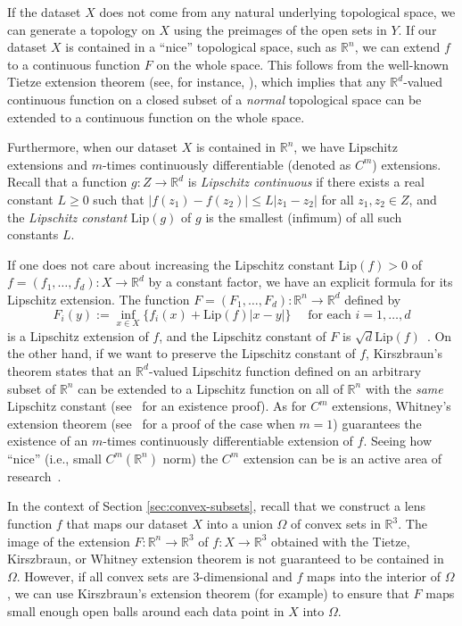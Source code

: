 \documentclass[reqno,oneside,11pt]{amsart}
\theoremstyle{definition}
\theoremstyle{remark}
\def\R{\mathbb{R}}
\begin{document}
If the dataset $X$ does not come from any natural underlying topological space, we can generate a topology on $X$ using the preimages of the open sets in $Y$. %
%
If our dataset $X$ is contained in a ``nice'' topological space, such as $\mathbb{R}^n$, we can extend $f$ to a continuous function $F$ on the whole space.
This follows from the well-known Tietze extension theorem (see, for instance, \cite{MunkresTopology00}), which implies that any $\R^d$-valued continuous function on a closed subset of a {\it normal} topological space can be extended to a continuous function on the whole space.
%

Furthermore, when our dataset $X$ is contained in $\R^n$, we have Lipschitz extensions and $m$-times continuously differentiable (denoted as $C^m$) extensions. Recall that a function $g:Z \to \R^d $ is \emph{Lipschitz continuous} if there exists a real constant $L\geq 0$ such that $|f(z_1) - f(z_2)| \leq L|z_1 - z_2|$ for all $z_1, z_2 \in Z$, and the \emph{Lipschitz constant} $\mathrm{Lip}(g)$ of $g$ is the smallest (infimum) of all such constants $L$.

If one does not care about increasing the Lipschitz constant $\mathrm{Lip}(f) > 0$ of $f = (f_1, \dots, f_d) \colon X\to \R^d$ by a constant factor, we have an explicit formula for its Lipschitz extension.
The function $F = (F_1, \dots, F_d) \colon \R^n \to \R^d$ defined by 
\[
F_i(y) := \inf_{x \in X} \{f_i(x) + \mathrm{Lip}(f)|x - y|\}\quad \text{ for each } i = 1, \dots, d
\]
is a Lipschitz extension of $f$, and the Lipschitz constant of $F$ is $\sqrt{d} \mathrm{Lip}(f)$~\cite[Theorem 3.1]{evans2018measure}. 
On the other hand, if we want to preserve the Lipschitz constant of $f$, Kirszbraun's theorem states that an $\R^d$-valued Lipschitz function defined on an arbitrary subset of $\R^n$ can be extended to a Lipschitz function on all of $\R^n$ with the {\it same} Lipschitz constant (see~\cite[2.10.43]{federer2014geometric} for an existence proof). 
As for $C^m$ extensions, Whitney's extension theorem (see~\cite[Theorem 6.10]{evans2018measure} for a proof of the case when $m = 1$) guarantees the existence of an $m$-times continuously differentiable extension of $f$. 
Seeing how ``nice'' (i.e., small $C^m(\R^n)$ norm) the $C^m$ extension can be is an active area of research~\cite{fefferman2009whitney, fefferman2020fitting}.

In the context of Section \ref{sec:convex-subsets}, recall that we construct a lens function $f$ that maps our dataset $X$ into a union $\Omega$ of convex sets in $\R^3$. The image of the extension $F \colon \R^n \to \R^3$ of $f \colon X \to \R^3$ obtained with the Tietze, Kirszbraun, or Whitney extension theorem is not guaranteed to be contained in $\Omega$. 
However, if all convex sets are 3-dimensional and $f$ maps into the interior of $\Omega$, we can use Kirszbraun's extension theorem (for example) to ensure that $F$ maps small enough open balls around each data point in $X$ into $\Omega$.
\end{document}
